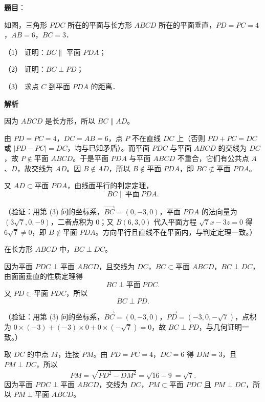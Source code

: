 \begin{answer}

\textbf{题目}：

如图，三角形 \(PDC\) 所在的平面与长方形 \(ABCD\) 所在的平面垂直，\(PD=PC=4\)，\(AB=6\)，\(BC=3\)．
\nopagebreak[4]
\begin{center}\end{center}
\nopagebreak[4]
（1） 证明：\(BC\parallel\) 平面 \(PDA\)；

（2） 证明：\(BC\perp PD\)；

（3） 求点 \(C\) 到平面 \(PDA\) 的距离．

\textbf{解析}


因为 \(ABCD\) 是长方形，所以 \(BC\parallel AD\)。

由 \(PD=PC=4\)，\(DC=AB=6\)，点 \(P\) 不在直线 \(DC\) 上（否则 \(PD+PC=DC\) 或 \(|PD-PC|=DC\)，均与已知矛盾）。而平面 \(PDC\) 与平面 \(ABCD\) 的交线为 \(DC\)，故 \(P\notin\text{平面 }ABCD\)。于是平面 \(PDA\) 与平面 \(ABCD\) 不重合，它们有公共点 \(A\)、\(D\)，故交线为 \(AD\)。因 \(B\notin AD\)，所以 \(B\notin\text{平面 }PDA\)，即 \(BC\not\subset\text{平面 }PDA\)。

又 \(AD\subset\text{平面 }PDA\)，由线面平行的判定定理，
\nopagebreak[4]
\[
BC\parallel\text{平面}\ PDA.
\]

（验证：用第 (3) 问的坐标系，\(\overrightarrow{BC}=(0,-3,0)\)，平面 \(PDA\) 的法向量为 \((3\sqrt7,0,-9)\)，二者点积为 \(0\)；又 \(B(6,3,0)\) 代入平面方程 \(\sqrt7x-3z=0\) 得 \(6\sqrt7\neq0\)，即 \(B\notin\text{平面 }PDA\)。方向平行且直线不在平面内，与判定定理一致。）


在长方形 \(ABCD\) 中，\(BC\perp DC\)。

因为平面 \(PDC\perp\text{平面 }ABCD\)，且交线为 \(DC\)，\(BC\subset\text{平面 }ABCD\)，\(BC\perp DC\)，由面面垂直的性质定理得
\nopagebreak[4]
\[
BC\perp\text{平面}\ PDC.
\]
又 \(PD\subset\text{平面 }PDC\)，所以
\nopagebreak[4]
\[
BC\perp PD.
\]

（验证：用第 (3) 问的坐标系，\(\overrightarrow{BC}=(0,-3,0)\)，\(\overrightarrow{PD}=(-3,0,-\sqrt7)\)，点积为 \(0\times(-3)+(-3)\times0+0\times(-\sqrt7)=0\)，故 \(BC\perp PD\)，与几何证明一致。）


取 \(DC\) 的中点 \(M\)，连接 \(PM\)。由 \(PD=PC=4\)，\(DC=6\) 得 \(DM=3\)，且 \(PM\perp DC\)，所以
\nopagebreak[4]
\[
PM=\sqrt{PD^2-DM^2}=\sqrt{16-9}=\sqrt7.
\]
因为平面 \(PDC\perp\text{平面 }ABCD\)，交线为 \(DC\)，\(PM\subset\text{平面 }PDC\) 且 \(PM\perp DC\)，所以 \(PM\perp\text{平面 }ABCD\)。


\end{answer}
